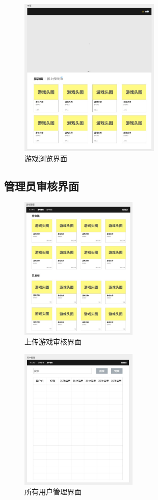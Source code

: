 \documentclass[12pt]{ctexart} %
\begin{document}
\begin{figure}[H]
  \centering
  \includegraphics[width=0.6\textwidth]{main.jpg}
  \caption{游戏浏览界面}
\end{figure}

\subsection{管理员审核界面}

\begin{figure}[H]
  \centering
  \includegraphics[width=0.5\textwidth]{admin_game.jpg}
  \caption{上传游戏审核界面}
\end{figure}

\begin{figure}[H]
  \centering
  \includegraphics[width=0.5\textwidth]{admin_user.jpg}
  \caption{所有用户管理界面}
\end{figure}
\end{document}
